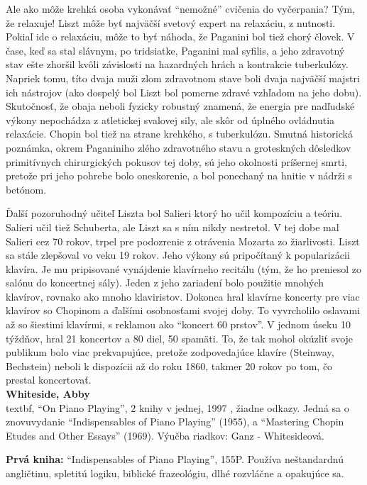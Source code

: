 \documentclass[11pt,a4paper]{book}
\begin{document}
Ale ako môže krehká osoba vykonávať “nemožné” cvičenia do vyčerpania? Tým, že relaxuje! Liszt môže byť najväčší svetový expert na relaxáciu, z nutnosti. Pokiaľ ide o relaxáciu, môže to byť náhoda, že Paganini bol tiež chorý človek. V čase, keď sa stal slávnym, po tridsiatke, Paganini mal syfilis, a jeho zdravotný stav ešte zhoršil kvôli závislosti na hazardných hrách a kontrakcie tuberkulózy. Napriek tomu, títo dvaja muži zlom zdravotnom stave boli dvaja najväčší majstri ich nástrojov (ako dospelý bol Liszt bol pomerne zdravé vzhľadom na jeho dobu). Skutočnosť, že obaja neboli fyzicky robustný znamená, že energia pre nadľudské výkony nepochádza z atletickej svalovej sily, ale skôr od úplného ovládnutia relaxácie. Chopin bol tiež na strane krehkého, s tuberkulózu. Smutná historická poznámka, okrem Paganiniho zlého zdravotného stavu a groteskných dôsledkov primitívnych chirurgických pokusov tej doby, sú jeho okolnosti príšernej smrti, pretože pri jeho pohrebe bolo oneskorenie, a bol ponechaný na hnitie v nádrži s betónom. 

Ďalší pozoruhodný učiteľ Liszta bol Salieri ktorý ho učil kompozíciu a teóriu. Salieri učil tiež Schuberta, ale Liszt sa s ním nikdy nestretol. V tej dobe mal Salieri cez 70 rokov, trpel pre podozrenie z otrávenia Mozarta zo žiarlivosti. Liszt sa stále zlepšoval vo veku 19 rokov. Jeho výkony sú pripočítaný k popularizácii klavíra. Je mu pripisované vynájdenie klavírneho recitálu (tým, že ho preniesol zo salónu do koncertnej sály). Jeden z jeho zariadení bolo použitie mnohých klavírov, rovnako ako mnoho klaviristov. Dokonca hral klavírne koncerty pre viac klavírov so Chopinom a ďalšími osobnosťami svojej doby. To vyvrcholilo oslavami až so šiestimi klavírmi, s reklamou ako “koncert 60 prstov”. V jednom úseku 10 týždňov, hral 21 koncertov a 80 diel, 50 spamäti. To, že tak mohol okúzliť svoje publikum bolo viac prekvapujúce, pretože zodpovedajúce klavíre (Steinway, Bechstein) neboli k dispozícii až do roku 1860, takmer 20 rokov po tom, čo prestal koncertovať.
\medskip\\
\textbf{Whiteside, Abby}\label{ref:whiteside}\\textbf{,} “On Piano Playing”, 2 knihy v jednej, 1997 , žiadne odkazy. Jedná sa o znovuvydanie “Indispensables of Piano Playing” (1955), a “Mastering Chopin Etudes and Other Essays” (1969). Výučba riadkov: Ganz - Whitesideová. 

\textbf{Prvá kniha:} “Indispensables of Piano Playing”, 155P. Používa neštandardnú angličtinu, spletitú logiku, biblické frazeológiu, dlhé rozvláčne a opakujúce sa. 
\end{document}
